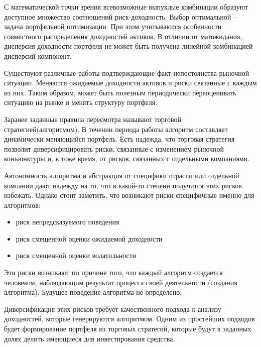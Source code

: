 С математической точки зрения всевозможные выпуклые комбинации образуют доступное множество соотношений риск-доходность. Выбор оптимальной -- задача портфельной оптимизации. При этом учитываются особенности совместного распределения доходностей активов. В отличии от матожидания, дисперсия доходности портфеля не может быть получена линейной комбинацией дисперсий компонент. 

Существуют различные работы подтверждающие факт непостоянства рыночной ситуации. Меняются ожидаемые доходности активов и риски связанные с каждым из них. Таким образом, может быть полезным периодически переоценивать ситуацию на рынке и менять структуру портфеля. 

Заранее заданные правила пересмотра называют торговой стратегией(алгоритмом). В течении периода работы алгоритм составляет динамически меняющийся портфель. Есть надежда, что торговая стратегия позволит диверсифицировать риски, связанные с изменением рыночной конъюнктуры и, в тоже время, от рисков, связанных с отдельными компаниями. 

Автономность алгоритма и абстракция от специфики отрасли или отдельной компании дают надежду на то, что в какой-то степени получится этих рисков избежать. Однако стоит заметить, что возникают риски специфичные именно для алгоритмов:
\begin{itemize}
	\item риск непредсказуемого поведения
	\item риск смещенной оценки ожидаемой доходности
	\item риск смещенной оценки волатильности
\end{itemize}
Эти риски возникают по причине того, что каждый алгоритм создается человеком, наблюдающим результат процесса своей деятельности (создания алгоритма). Будущее поведение алгоритма не определено.

Диверсификация этих рисков требует качественного подхода к анализу доходностей, которые генерируются алгоритмом. Одним из простейших подходов будет формирование портфеля из торговых стратегий, которые будут в заданных долях делить имеющиеся для инвестирования средства.

